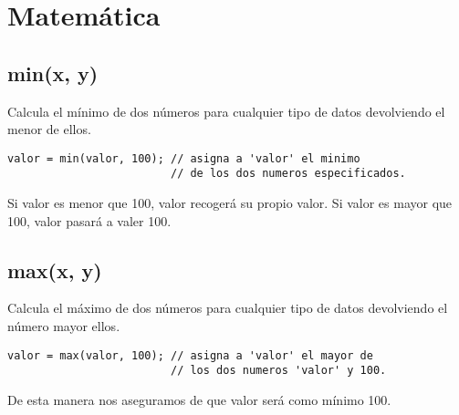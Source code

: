 \chapter{Matemática}
\section{min(x, y)}

Calcula el mínimo de dos números para cualquier tipo de datos devolviendo el menor de ellos.
\begin{lstlisting}
valor = min(valor, 100); // asigna a 'valor' el minimo
                         // de los dos numeros especificados.
\end{lstlisting}
Si valor es menor que 100, valor recogerá su propio valor. Si valor es mayor que 100, valor pasará a valer 100.
\section{max(x, y)}

Calcula el máximo de dos números para cualquier tipo de datos devolviendo el número mayor ellos.
\begin{lstlisting}
valor = max(valor, 100); // asigna a 'valor' el mayor de
                         // los dos numeros 'valor' y 100.
\end{lstlisting}
De esta manera nos aseguramos de que valor será como mínimo 100.